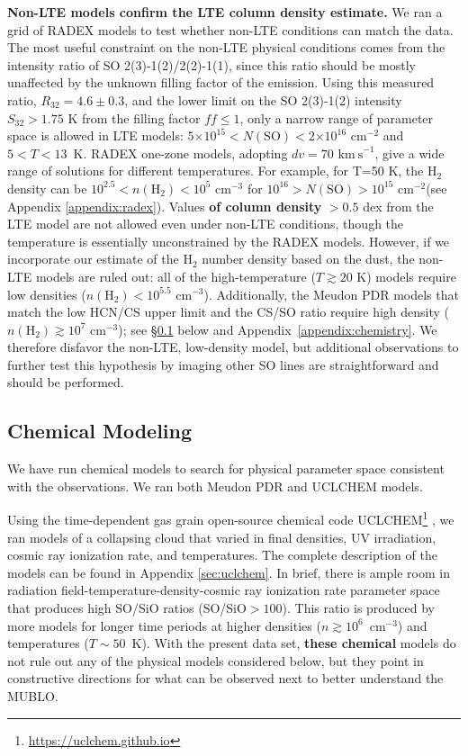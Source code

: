 \documentclass[]{aastex631}
\newcommand{\kms}{\ensuremath{\mathrm{km~s}^{-1}}\xspace}
\newcommand{\percc}{\ensuremath{\mathrm{cm}^{-3}}\xspace}
\newcommand{\persc}{\ensuremath{\mathrm{cm}^{-2}}\xspace}
\def\ee#1{\ensuremath{\times10^{#1}}}
\def\rr#1{\textbf{#1}}
\begin{document}
\rr{Non-LTE models confirm the LTE column density estimate.}
We ran a grid of RADEX \rr{\citep{vanderTak2007}} models to test whether non-LTE conditions can match the data.
The most useful constraint on the non-LTE physical conditions comes from the intensity ratio of SO 2(3)-1(2)/2(2)-1(1), since this ratio should be mostly unaffected by the unknown filling factor of the emission.
Using this measured ratio, $R_{32}=4.6\pm0.3$, and the lower limit on the SO 2(3)-1(2) intensity $S_{32} > 1.75$ K from the filling factor $ff\leq1$, only a narrow range of parameter space is allowed in LTE models: $5\ee{15} < N(\mathrm{SO}) < 2\ee{16}$ \persc and $5< T < 13$~K.
RADEX one-zone models, adopting $dv=70$ \kms, give a wide range of solutions for different temperatures.
For example, for T=50 K, the H$_2$ density can be $10^{2.5} < n(\mathrm{H}_2) < 10^5$ \percc for $10^{16} > N(\mathrm{SO}) > 10^{15}$ \persc (see Appendix \ref{appendix:radex}).
Values \rr{of column density} $>0.5$ dex from the LTE model are not allowed even under non-LTE conditions, though the temperature is essentially unconstrained by the RADEX models.
However, if we incorporate our estimate of the H$_2$ number density based on the dust, the non-LTE models are ruled out: all of the high-temperature ($T\gtrsim20$ K) models require low densities ($n(\mathrm{H}_2)<10^{5.5}$ \percc).
Additionally, the Meudon PDR models that match the low HCN/CS upper limit and the CS/SO ratio require high density ($n(\mathrm{H}_2)\gtrsim10^7$ \percc); see \S \ref{sec:chemistry} below and Appendix~\ref{appendix:chemistry}.
We therefore disfavor the non-LTE, low-density model, but additional observations to further test this hypothesis by imaging other SO lines are straightforward and should be performed.


\subsection{Chemical Modeling}
\label{sec:chemistry}
We have run chemical models to search for physical parameter space consistent with the observations.
We ran both Meudon PDR \citep{LePetit2006} and UCLCHEM \citep{Holdship2017} models.

Using the time-dependent gas grain open-source chemical code UCLCHEM\footnote{\url{https://uclchem.github.io}} \citep{Holdship2017}, we ran models of a collapsing cloud that varied in final densities, UV irradiation, cosmic ray ionization rate, and temperatures.
The complete description of the models can be found in Appendix \ref{sec:uclchem}.
In brief, there is ample room in radiation field-temperature-density-cosmic ray ionization rate parameter space that produces high SO/SiO ratios (SO/SiO$>100$).
This ratio is produced by more models for longer time periods at higher densities ($n\gtrsim10^6$~\percc) and temperatures ($T\sim50$~K).
With the present data set, \rr{these chemical} models do not rule out any of the physical models considered below, but they point in constructive directions for what can be observed next to better understand the MUBLO.
\end{document}
